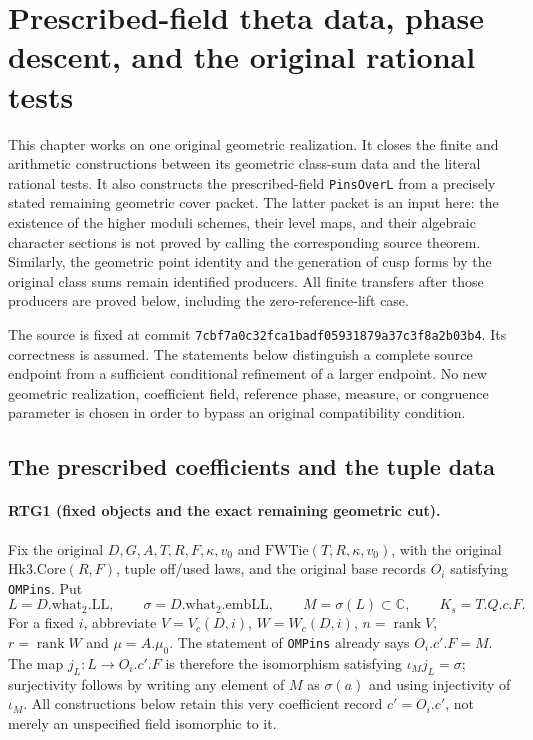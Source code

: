 \section{Prescribed-field theta data, phase descent, and the original rational tests}
\label{sec:rational-theta}

This chapter works on one original geometric realization.  It closes the
finite and arithmetic constructions between its geometric class-sum data
and the literal rational tests.  It also constructs the prescribed-field
\texttt{PinsOverL} from a precisely stated remaining geometric cover packet.
The latter packet is an input here: the existence of the higher moduli
schemes, their level maps, and their algebraic character sections is not
proved by calling the corresponding source theorem.  Similarly, the
geometric point identity and the generation of cusp forms by the original
class sums remain identified producers.  All finite transfers after those
producers are proved below, including the zero-reference-lift case.

The source is fixed at commit
\texttt{7cbf7a0c32fca1badf05931879a37c3f8a2b03b4}.  Its correctness is assumed.
The statements below distinguish a complete source endpoint from a
sufficient conditional refinement of a larger endpoint.  No new geometric
realization, coefficient field, reference phase, measure, or congruence
parameter is chosen in order to bypass an original compatibility condition.

\subsection{The prescribed coefficients and the tuple data}

\paragraph{RTG1 (fixed objects and the exact remaining geometric cut).}
\label{claim:RTG1}
Fix the original $D,G,A,T,R,F,\kappa,v_0$ and
\(\mathrm{FWTie}(T,R,\kappa,v_0)\), with the original
\(\mathrm{Hk3.Core}(R,F)\), tuple off/used laws, and the original base
records $O_i$ satisfying \texttt{OMPins}.  Put
\[
 L=D.\mathrm{what}_2.\mathrm{LL},\qquad
 \sigma=D.\mathrm{what}_2.\mathrm{embLL},\qquad
 M=\sigma(L)\subset\mathbb C,\qquad K_s=T.Q.c.F.                 \tag{RTG.1}
\]
For a fixed $i$, abbreviate $V=V_c(D,i)$, $W=W_c(D,i)$,
$n=\operatorname{rank}V$, $r=\operatorname{rank}W$ and
$\mu= A.\mu_0$.  The statement of \texttt{OMPins} already says
\(O_i.c'.F=M\).  The map $j_L:L\to O_i.c'.F$ is therefore the
isomorphism satisfying $\iota_Mj_L=\sigma$; surjectivity follows by writing
any element of $M$ as $\sigma(a)$ and using injectivity of $\iota_M$.
All constructions below retain this very coefficient record $c'=O_i.c'$,
not merely an unspecified field isomorphic to it.

